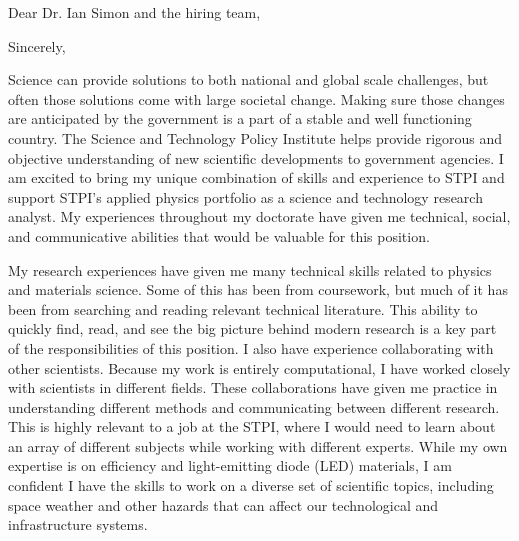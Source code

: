 \thispagestyle{empty}


\date{August 10, 2018}
\opening{Dear Dr. Ian Simon and the hiring team,}
\closing{Sincerely,}
\makelettertitle

Science can provide solutions to both national and global scale challenges, but often those solutions come with large societal change. Making sure those changes are anticipated by the government is a part of a stable and well functioning country. The Science and Technology Policy Institute helps provide rigorous and objective understanding of new scientific developments to government agencies. I am excited to bring my unique combination of skills and experience to STPI and support STPI's applied physics portfolio as a science and technology research analyst. My experiences throughout my doctorate have given me technical, social, and communicative abilities that would be valuable for this position.

My research experiences have given me many technical skills related to physics and materials science. Some of this has been from coursework, but much of it has been from searching and reading relevant technical literature. This ability to quickly find, read, and see the big picture behind modern research is a key part of the responsibilities of this position. I also have experience collaborating with other scientists. Because my work is entirely computational, I have worked closely with scientists in different fields. These collaborations have given me practice in understanding different methods and communicating between different research. This is highly relevant to a job at the STPI, where I would need to learn about an array of different subjects while working with different experts. While my own expertise is on efficiency and light-emitting diode (LED) materials, I am confident I have the skills to work on a diverse set of scientific topics, including space weather and other hazards that can affect our technological and infrastructure systems.

